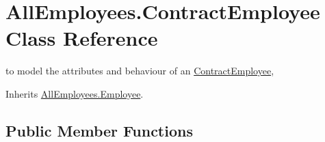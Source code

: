 \hypertarget{class_all_employees_1_1_contract_employee}{\section{All\-Employees.\-Contract\-Employee Class Reference}
\label{class_all_employees_1_1_contract_employee}
}


to model the attributes and behaviour of an \hyperlink{class_all_employees_1_1_contract_employee}{Contract\-Employee},  




Inherits \hyperlink{class_all_employees_1_1_employee}{All\-Employees.\-Employee}.

\subsection*{Public Member Functions}
